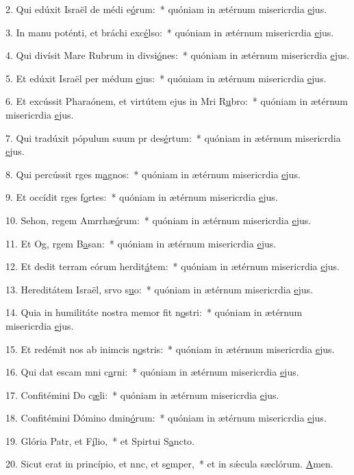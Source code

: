 2. Qui edúxit Israël de médi e\uline{ó}rum:~* quóniam in ætérnum misericrdia \uline{e}jus.\par 
3. In manu poténti, et bráchi exc\uline{é}lso:~* quóniam in ætérnum misericrdia \uline{e}jus.\par 
4. Qui divísit Mare Rubrum in divsi\uline{ó}nes:~* quóniam in ætérnum misericrdia \uline{e}jus.\par 
5. Et edúxit Israël per médum \uline{e}jus:~* quóniam in ætérnum misericrdia \uline{e}jus.\par 
6. Et excússit Pharaónem, et virtútem ejus in Mri R\uline{u}bro:~* quóniam in ætérnum misericrdia \uline{e}jus.\par 
7. Qui tradúxit pópulum suum pr des\uline{é}rtum:~* quóniam in ætérnum misericrdia \uline{e}jus.\par 
8. Qui percússit rges m\uline{a}gnos:~* quóniam in ætérnum misericrdia \uline{e}jus.\par 
9. Et occídit rges f\uline{o}rtes:~* quóniam in ætérnum misericrdia \uline{e}jus.\par 
10. Sehon, regem Amrrhæ\uline{ó}rum:~* quóniam in ætérnum misericrdia \uline{e}jus.\par 
11. Et Og, rgem B\uline{a}san:~* quóniam in ætérnum misericrdia \uline{e}jus.\par 
12. Et dedit terram eórum herdit\uline{á}tem:~* quóniam in ætérnum misericrdia \uline{e}jus.\par 
13. Hereditátem Israël, srvo s\uline{u}o:~* quóniam in ætérnum misericrdia \uline{e}jus.\par 
14. Quia in humilitáte nostra memor fit n\uline{o}stri:~* quóniam in ætérnum misericrdia \uline{e}jus.\par 
15. Et redémit nos ab inimcis n\uline{o}stris:~* quóniam in ætérnum misericrdia \uline{e}jus.\par 
16. Qui dat escam mni c\uline{a}rni:~* quóniam in ætérnum misericrdia \uline{e}jus.\par 
17. Confitémini Do c\uline{æ}li:~* quóniam in ætérnum misericrdia \uline{e}jus.\par 
18. Confitémini Dómino dmin\uline{ó}rum:~* quóniam in ætérnum misericrdia \uline{e}jus.\par 
19. Glória Patr, et F\uline{í}lio,~* et Spirtui S\uline{a}ncto.\par 
20. Sicut erat in princípio, et nnc, et s\uline{e}mper,~* et in sǽcula sæclórum. \uline{A}men.\par 

